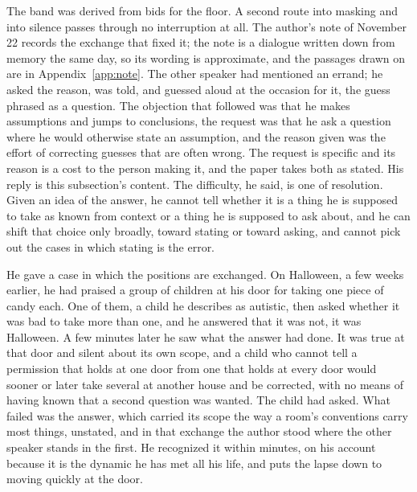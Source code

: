 The band was derived from bids for the floor. A second route into masking and into silence passes through no interruption at all. The author's note of November 22 records the exchange that fixed it; the note is a dialogue written down from memory the same day, so its wording is approximate, and the passages drawn on are in Appendix~\ref{app:note}. The other speaker had mentioned an errand; he asked the reason, was told, and guessed aloud at the occasion for it, the guess phrased as a question. The objection that followed was that he makes assumptions and jumps to conclusions, the request was that he ask a question where he would otherwise state an assumption, and the reason given was the effort of correcting guesses that are often wrong. The request is specific and its reason is a cost to the person making it, and the paper takes both as stated. His reply is this subsection's content. The difficulty, he said, is one of resolution. Given an idea of the answer, he cannot tell whether it is a thing he is supposed to take as known from context or a thing he is supposed to ask about, and he can shift that choice only broadly, toward stating or toward asking, and cannot pick out the cases in which stating is the error.

He gave a case in which the positions are exchanged. On Halloween, a few weeks earlier, he had praised a group of children at his door for taking one piece of candy each. One of them, a child he describes as autistic, then asked whether it was bad to take more than one, and he answered that it was not, it was Halloween. A few minutes later he saw what the answer had done. It was true at that door and silent about its own scope, and a child who cannot tell a permission that holds at one door from one that holds at every door would sooner or later take several at another house and be corrected, with no means of having known that a second question was wanted. The child had asked. What failed was the answer, which carried its scope the way a room's conventions carry most things, unstated, and in that exchange the author stood where the other speaker stands in the first. He recognized it within minutes, on his account because it is the dynamic he has met all his life, and puts the lapse down to moving quickly at the door.

